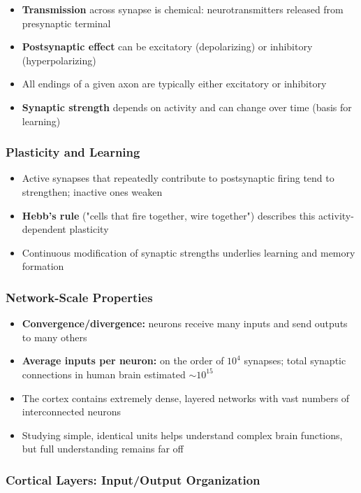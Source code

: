 \begin{itemize}
\item \textbf{Transmission} across synapse is chemical: neurotransmitters released from presynaptic terminal
\item \textbf{Postsynaptic effect} can be excitatory (depolarizing) or inhibitory (hyperpolarizing)
\item All endings of a given axon are typically either excitatory or inhibitory
\item \textbf{Synaptic strength} depends on activity and can change over time (basis for learning)
\end{itemize}

\subsubsection{Plasticity and Learning}

\begin{itemize}
\item Active synapses that repeatedly contribute to postsynaptic firing tend to strengthen; inactive ones weaken
\item \textbf{Hebb's rule} ("cells that fire together, wire together") describes this activity-dependent plasticity
\item Continuous modification of synaptic strengths underlies learning and memory formation
\end{itemize}

\subsubsection{Network-Scale Properties}

\begin{itemize}
\item \textbf{Convergence/divergence:} neurons receive many inputs and send outputs to many others
\item \textbf{Average inputs per neuron:} on the order of $10^4$ synapses; total synaptic connections in human brain estimated $\sim 10^{15}$
\item The cortex contains extremely dense, layered networks with vast numbers of interconnected neurons
\item Studying simple, identical units helps understand complex brain functions, but full understanding remains far off
\end{itemize}

\subsubsection{Cortical Layers: Input/Output Organization}

